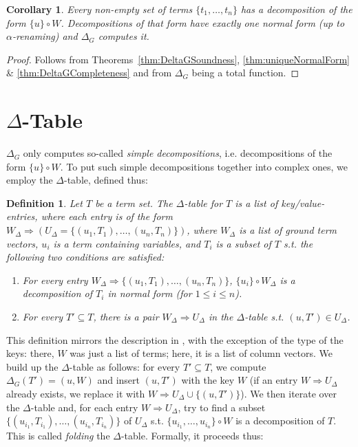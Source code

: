 \documentclass[a4paper, 11pt]{report}
\newtheorem{definition}{Definition}
\newtheorem{corollary}{Corollary}
\begin{document}
\begin{corollary}
  Every non-empty set of terms $\{t_1,\dots,t_n\}$ has a decomposition of the form $\{u\} \circ W$. Decompositions of that form have exactly one normal form (up to $\alpha$-renaming) and $\Delta_G$ computes it.
  \label{thm:deltaGCorrectness}
\end{corollary}

\begin{proof}
  Follows from Theorems~\ref{thm:DeltaGSoundness}, \ref{thm:uniqueNormalForm} \& \ref{thm:DeltaGCompleteness} and from $\Delta_G$ being a total function.
\end{proof}


\section{$\Delta$-Table}

$\Delta_G$ only computes so-called {\em simple decompositions}, i.e. decompositions of the form $\{u\} \circ W$. To put such simple decompositions together into complex ones, we employ the $\Delta$-table, defined thus:

\begin{definition}
  \label{def:deltaTableDef}
  Let $T$ be a term set. The $\Delta$-table for $T$ is a list of key/value-entries, where each
  entry is of the form $W_\Delta \Rightarrow (U_\Delta = \{ (u_1,T_1),\ldots,(u_n,T_n) \})$,
  where $W_\Delta$ is a list of ground term vectors, $u_i$ is a term containing variables,
  and $T_i$ is a subset of $T$ s.t. the following two conditions are satisfied:

  \begin{enumerate}
    \item For every entry $W_\Delta \Rightarrow \{ (u_1,T_1),\ldots,(u_n,T_n) \}$, $\{u_i\} \circ W_\Delta$ is a
          decomposition of $T_i$ in normal form (for $1 \leq i \leq n$).
    \item For every $T' \subseteq T$, there is a pair $W_\Delta \Rightarrow U_\Delta$ in the $\Delta$-table s.t.
          $(u,T') \in U_\Delta$.
  \end{enumerate}
\end{definition}

This definition mirrors the description in \cite{cutIntro2013}, with the exception of the type of the keys: there, $W$ was just a list of terms; here, it is a list of column vectors.
We build up the $\Delta$-table as follows: for every $T' \subseteq T$, we compute
$\Delta_G(T') = (u, W)$ and insert $(u,T')$ with the key $W$ (if an entry
$W \Rightarrow U_\Delta$ already exists, we replace it with $W \Rightarrow U_\Delta \cup \{(u,T')\}$).
We then iterate over the $\Delta$-table and, for each entry $W \Rightarrow U_\Delta$,
try to find a subset $\{(u_{i_1},T_{i_1}),\ldots,(u_{i_n},T_{i_n})\}$ of $U_\Delta$ s.t.
$\{u_{i_1},\ldots,u_{i_n}\} \circ W$ is a decomposition of $T$. This is called {\em folding} the $\Delta$-table. Formally, it proceeds thus:
\end{document}

